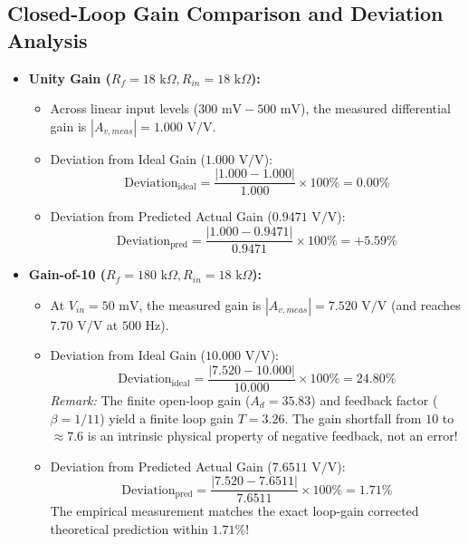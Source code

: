 \documentclass[11pt,a4paper]{article}
\begin{document}
\subsection{Closed-Loop Gain Comparison and Deviation Analysis}
\begin{itemize}
    \item \textbf{Unity Gain ($R_f = 18\text{ k}\Omega, R_{in} = 18\text{ k}\Omega$):}
    \begin{itemize}
        \item Across linear input levels ($300\text{ mV} - 500\text{ mV}$), the measured differential gain is $|A_{v,meas}| = 1.000\text{ V/V}$.
        \item Deviation from Ideal Gain ($1.000\text{ V/V}$):
        \begin{equation}
            \text{Deviation}_{\text{ideal}} = \frac{|1.000 - 1.000|}{1.000} \times 100\% = \mathbf{0.00\%}
        \end{equation}
        \item Deviation from Predicted Actual Gain ($0.9471\text{ V/V}$):
        \begin{equation}
            \text{Deviation}_{\text{pred}} = \frac{|1.000 - 0.9471|}{0.9471} \times 100\% = \mathbf{+5.59\%}
        \end{equation}
    \end{itemize}
    \item \textbf{Gain-of-10 ($R_f = 180\text{ k}\Omega, R_{in} = 18\text{ k}\Omega$):}
    \begin{itemize}
        \item At $V_{in} = 50\text{ mV}$, the measured gain is $|A_{v,meas}| = 7.520\text{ V/V}$ (and reaches $7.70\text{ V/V}$ at $500\text{ Hz}$).
        \item Deviation from Ideal Gain ($10.000\text{ V/V}$):
        \begin{equation}
            \text{Deviation}_{\text{ideal}} = \frac{|7.520 - 10.000|}{10.000} \times 100\% = \mathbf{24.80\%}
        \end{equation}
        \textit{Remark:} The finite open-loop gain ($A_d = 35.83$) and feedback factor ($\beta = 1/11$) yield a finite loop gain $T = 3.26$. The gain shortfall from $10$ to $\approx 7.6$ is an intrinsic physical property of negative feedback, not an error!
        \item Deviation from Predicted Actual Gain ($7.6511\text{ V/V}$):
        \begin{equation}
            \text{Deviation}_{\text{pred}} = \frac{|7.520 - 7.6511|}{7.6511} \times 100\% = \mathbf{1.71\%}
        \end{equation}
        The empirical measurement matches the exact loop-gain corrected theoretical prediction within $\mathbf{1.71\%}$!
    \end{itemize}
\end{itemize}
\end{document}

